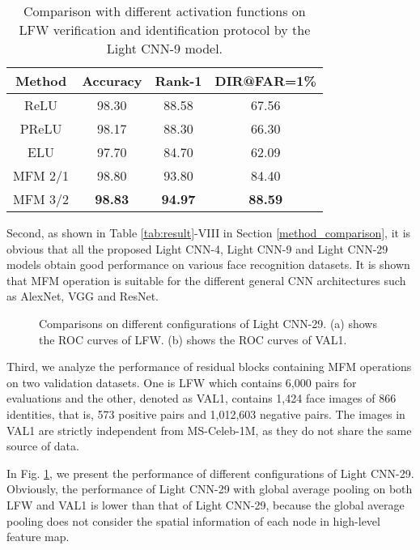 \documentclass[journal,transmag]{IEEEtran}
\begin{document}
\begin{table}[t]
\centering
\caption{Comparison with different activation functions on LFW verification and identification protocol by the Light CNN-9 model.}
\begin{tabular}{|c|c|c|c|}
\hline
Method & Accuracy &  Rank-1 & DIR@FAR=1\% \\
\hline
ReLU \cite{nair2010rectified} & 98.30 & 88.58  & 67.56  \\
\hline
PReLU \cite{DBLP:conf/iccv/HeZRS15} & 98.17 &  88.30 &   66.30\\
\hline
ELU \cite{DBLP:journals/corr/ClevertUH15} & 97.70 & 84.70  & 62.09 \\
\hline
MFM 2/1 & 98.80   & 93.80 &  84.40\\
\hline
MFM 3/2& \textbf{98.83}   & \textbf{94.97} &  \textbf{88.59}\\
\hline
\end{tabular}
\label{tab:relu_mfm}
\end{table}

Second, as shown in Table \ref{tab:result}-VIII in Section \ref{method_comparison}, it is obvious that all the proposed Light CNN-4, Light CNN-9 and Light CNN-29 models obtain good performance on various face recognition datasets. It is shown that MFM operation is suitable for the different general CNN architectures such as AlexNet, VGG and ResNet.

\begin{figure}[tbp]
\vspace{-2mm}
\centering
{}
\caption{Comparisons on different configurations of Light CNN-29. (a) shows the ROC curves of LFW. (b) shows the ROC curves of VAL1.}
\label{fig_roc}
\end{figure}

Third, we analyze the performance of residual blocks containing MFM operations on two validation datasets. One is LFW which contains 6,000 pairs for evaluations and the other, denoted as VAL1, contains 1,424 face images of 866 identities, that is, 573 positive pairs and 1,012,603 negative pairs. The images in VAL1 are strictly independent from MS-Celeb-1M, as they do not share the same source of data.

In Fig. \ref{fig_roc}, we present the performance of different configurations of Light CNN-29. Obviously, the performance of Light CNN-29 with global average pooling on both LFW and VAL1 is lower than that of Light CNN-29, because the global average pooling does not consider the spatial information of each node in high-level feature map.
\end{document}
